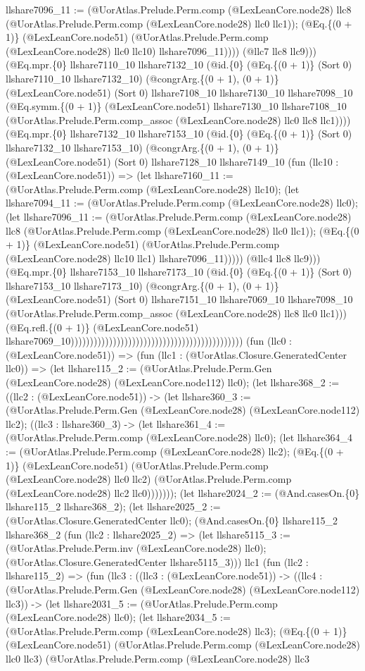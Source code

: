 \documentclass[11pt]{article}
\begin{document}
llshare7096\_11 := (@UorAtlas.Prelude.Perm.comp (@LexLeanCore.node28) llc8 (@UorAtlas.Prelude.Perm.comp (@LexLeanCore.node28) llc0 llc1)); (@Eq.\{(0 + 1)\} (@LexLeanCore.node51) (@UorAtlas.Prelude.Perm.comp (@LexLeanCore.node28) llc0 llc10) llshare7096\_11)))) (@llc7 llc8 llc9))) (@Eq.mpr.\{0\} llshare7110\_10 llshare7132\_10 (@id.\{0\} (@Eq.\{(0 + 1)\} (Sort 0) llshare7110\_10 llshare7132\_10) (@congrArg.\{(0 + 1), (0 + 1)\} (@LexLeanCore.node51) (Sort 0) llshare7108\_10 llshare7130\_10 llshare7098\_10 (@Eq.symm.\{(0 + 1)\} (@LexLeanCore.node51) llshare7130\_10 llshare7108\_10 (@UorAtlas.Prelude.Perm.comp\_assoc (@LexLeanCore.node28) llc0 llc8 llc1)))) (@Eq.mpr.\{0\} llshare7132\_10 llshare7153\_10 (@id.\{0\} (@Eq.\{(0 + 1)\} (Sort 0) llshare7132\_10 llshare7153\_10) (@congrArg.\{(0 + 1), (0 + 1)\} (@LexLeanCore.node51) (Sort 0) llshare7128\_10 llshare7149\_10 (fun (llc10 : (@LexLeanCore.node51)) => (let llshare7160\_11 := (@UorAtlas.Prelude.Perm.comp (@LexLeanCore.node28) llc10); (let llshare7094\_11 := (@UorAtlas.Prelude.Perm.comp (@LexLeanCore.node28) llc0); (let llshare7096\_11 := (@UorAtlas.Prelude.Perm.comp (@LexLeanCore.node28) llc8 (@UorAtlas.Prelude.Perm.comp (@LexLeanCore.node28) llc0 llc1)); (@Eq.\{(0 + 1)\} (@LexLeanCore.node51) (@UorAtlas.Prelude.Perm.comp (@LexLeanCore.node28) llc10 llc1) llshare7096\_11))))) (@llc4 llc8 llc9))) (@Eq.mpr.\{0\} llshare7153\_10 llshare7173\_10 (@id.\{0\} (@Eq.\{(0 + 1)\} (Sort 0) llshare7153\_10 llshare7173\_10) (@congrArg.\{(0 + 1), (0 + 1)\} (@LexLeanCore.node51) (Sort 0) llshare7151\_10 llshare7069\_10 llshare7098\_10 (@UorAtlas.Prelude.Perm.comp\_assoc (@LexLeanCore.node28) llc8 llc0 llc1))) (@Eq.refl.\{(0 + 1)\} (@LexLeanCore.node51) llshare7069\_10))))))))))))))))))))))))))))))))))))))))))))) (fun (llc0 : (@LexLeanCore.node51)) => (fun (llc1 : (@UorAtlas.Closure.GeneratedCenter llc0)) => (let llshare115\_2 := (@UorAtlas.Prelude.Perm.Gen (@LexLeanCore.node28) (@LexLeanCore.node112) llc0); (let llshare368\_2 := ((llc2 : (@LexLeanCore.node51)) -> (let llshare360\_3 := (@UorAtlas.Prelude.Perm.Gen (@LexLeanCore.node28) (@LexLeanCore.node112) llc2); ((llc3 : llshare360\_3) -> (let llshare361\_4 := (@UorAtlas.Prelude.Perm.comp (@LexLeanCore.node28) llc0); (let llshare364\_4 := (@UorAtlas.Prelude.Perm.comp (@LexLeanCore.node28) llc2); (@Eq.\{(0 + 1)\} (@LexLeanCore.node51) (@UorAtlas.Prelude.Perm.comp (@LexLeanCore.node28) llc0 llc2) (@UorAtlas.Prelude.Perm.comp (@LexLeanCore.node28) llc2 llc0))))))); (let llshare2024\_2 := (@And.casesOn.\{0\} llshare115\_2 llshare368\_2); (let llshare2025\_2 := (@UorAtlas.Closure.GeneratedCenter llc0); (@And.casesOn.\{0\} llshare115\_2 llshare368\_2 (fun (llc2 : llshare2025\_2) => (let llshare5115\_3 := (@UorAtlas.Prelude.Perm.inv (@LexLeanCore.node28) llc0); (@UorAtlas.Closure.GeneratedCenter llshare5115\_3))) llc1 (fun (llc2 : llshare115\_2) => (fun (llc3 : ((llc3 : (@LexLeanCore.node51)) -> ((llc4 : (@UorAtlas.Prelude.Perm.Gen (@LexLeanCore.node28) (@LexLeanCore.node112) llc3)) -> (let llshare2031\_5 := (@UorAtlas.Prelude.Perm.comp (@LexLeanCore.node28) llc0); (let llshare2034\_5 := (@UorAtlas.Prelude.Perm.comp (@LexLeanCore.node28) llc3); (@Eq.\{(0 + 1)\} (@LexLeanCore.node51) (@UorAtlas.Prelude.Perm.comp (@LexLeanCore.node28) llc0 llc3) (@UorAtlas.Prelude.Perm.comp (@LexLeanCore.node28) llc3 
\end{document}
